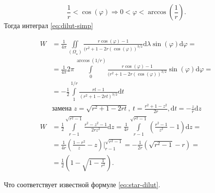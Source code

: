 \documentclass[12pt]{article}
\begin{document}
\begin{equation}\nonumber
\frac{1}{r} < \cos(\varphi) \Rightarrow 0 < \varphi < \arccos\left(\frac{1}{r}\right).
\end{equation}
Тогда интеграл \eqref{eq:dilut-simp}

\begin{equation}\nonumber
\begin{aligned}
W &= \frac{1}{4\pi}\iint\limits_{(\Omega_\star)}\frac{r\cos(\varphi)-1}{(r^2+1-2r(\cos(\varphi))^{3/2}}\text{d}\lambda\sin(\varphi)\text{d}\varphi =\\
&= \frac{1}{4\pi}2\pi\int\limits_0^{\arccos(1/r)}\frac{r\cos(\varphi)-1}{(r^2+1-2r(\cos(\varphi))^{3/2}}\sin(\varphi)\text{d}\varphi = \\ 
&= -\frac{1}{2}\int\limits_1^{1/r}\frac{rt-1}{(r^2+1-2rt)^{3/2}}\text{d}t \\
&\text{замена } z = \sqrt{r^2+1-2rt},\ t = \frac{r^2+1-z^2}{2r}, \text{d}t = -\frac{z}{r}\text{d}z \\
W &= \frac{1}{2}\int\limits_{r-1}^{\sqrt{r^2-1}}\frac{r^2-z^2-1}{2rz^2}\text{d}z =\frac{1}{4r}\int\limits_{r-1}^{\sqrt{r^2-1}}\left(\frac{r^2-1}{z^2} - 1\right)\text{d}z = \\
& = \frac{1}{4r}\left(\frac{1-r^2}{z} - z\right)\Bigg|_{r-1}^{\sqrt{r^2-1}} = -\frac{1}{2r}\left(\sqrt{r^2-1} - r\right) = \\
& = \frac{1}{2}\left(1-\sqrt{1-\frac{1}{r^2}}\right). 
\end{aligned}
\end{equation}

Что соответствует известной формуле \eqref{eq:star-dilut}.
\end{document}
